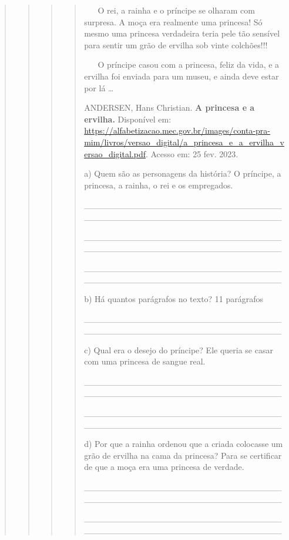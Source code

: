 \begin{quote}
\begin{quote}
\begin{quote}
\begin{quote}
~ ~ \protect\hypertarget{_Hlk128236047}{}{}O rei, a rainha e o príncipe
se olharam com surpresa. A moça era realmente uma princesa! Só mesmo uma
princesa verdadeira teria pele tão sensível para sentir um grão de
ervilha sob vinte colchões!!!

~ ~ O príncipe casou com a princesa, feliz da vida, e a ervilha foi
enviada para um museu, e ainda deve estar por lá \ldots{}

ANDERSEN, Hans Christian. \textbf{A princesa e a ervilha.} Disponível
em:
\url{https://alfabetizacao.mec.gov.br/images/conta-pra-mim/livros/versao_digital/a_princesa_e_a_ervilha_versao_digital.pdf}.
Acesso em: 25 fev. 2023.

a) Quem são as personagens da história? O príncipe, a princesa, a
rainha, o rei e os empregados.

\_\_\_\_\_\_\_\_\_\_\_\_\_\_\_\_\_\_\_\_\_\_\_\_\_\_\_\_\_\_\_\_\_\_\_\_\_\_\_\_\_\_\_\_\_\_\_\_\_\_\_\_\_\_\_\_\_\_\_\_\_\_\_\_

\_\_\_\_\_\_\_\_\_\_\_\_\_\_\_\_\_\_\_\_\_\_\_\_\_\_\_\_\_\_\_\_\_\_\_\_\_\_\_\_\_\_\_\_\_\_\_\_\_\_\_\_\_\_\_\_\_\_\_\_\_\_\_\_

\_\_\_\_\_\_\_\_\_\_\_\_\_\_\_\_\_\_\_\_\_\_\_\_\_\_\_\_\_\_\_\_\_\_\_\_\_\_\_\_\_\_\_\_\_\_\_\_\_\_\_\_\_\_\_\_\_\_\_\_\_\_\_\_

b) Há quantos parágrafos no texto? 11 parágrafos

\_\_\_\_\_\_\_\_\_\_\_\_\_\_\_\_\_\_\_\_\_\_\_\_\_\_\_\_\_\_\_\_\_\_\_\_\_\_\_\_\_\_\_\_\_\_\_\_\_\_\_\_\_\_\_\_\_\_\_\_\_\_\_\_

c) Qual era o desejo do príncipe? Ele queria se casar com uma princesa
de sangue real.

\_\_\_\_\_\_\_\_\_\_\_\_\_\_\_\_\_\_\_\_\_\_\_\_\_\_\_\_\_\_\_\_\_\_\_\_\_\_\_\_\_\_\_\_\_\_\_\_\_\_\_\_\_\_\_\_\_\_\_\_\_\_\_\_

\_\_\_\_\_\_\_\_\_\_\_\_\_\_\_\_\_\_\_\_\_\_\_\_\_\_\_\_\_\_\_\_\_\_\_\_\_\_\_\_\_\_\_\_\_\_\_\_\_\_\_\_\_\_\_\_\_\_\_\_\_\_\_\_

d) Por que a rainha ordenou que a criada colocasse um grão de ervilha na
cama da princesa? Para se certificar de que a moça era uma princesa de
verdade.

\_\_\_\_\_\_\_\_\_\_\_\_\_\_\_\_\_\_\_\_\_\_\_\_\_\_\_\_\_\_\_\_\_\_\_\_\_\_\_\_\_\_\_\_\_\_\_\_\_\_\_\_\_\_\_\_\_\_\_\_\_\_\_\_

\_\_\_\_\_\_\_\_\_\_\_\_\_\_\_\_\_\_\_\_\_\_\_\_\_\_\_\_\_\_\_\_\_\_\_\_\_\_\_\_\_\_\_\_\_\_\_\_\_\_\_\_\_\_\_\_\_\_\_\_\_\_\_\_


\end{quote}
\end{quote}
\end{quote}
\end{quote}
